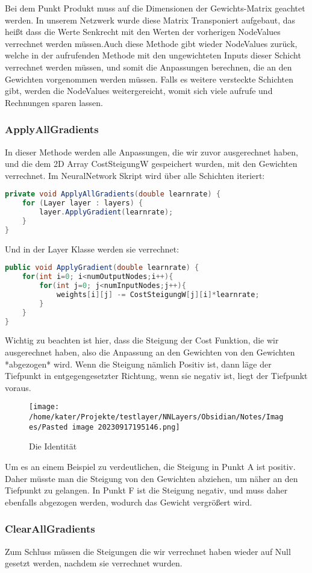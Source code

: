 \documentclass[12pt]{article}
\begin{document}
Bei dem Punkt Produkt muss auf die Dimensionen der Gewichts-Matrix geachtet werden. In unserem Netzwerk wurde diese Matrix Transponiert aufgebaut, das heißt dass die Werte Senkrecht mit den Werten der vorherigen NodeValues verrechnet werden müssen.Auch diese Methode gibt wieder NodeValues zurück, welche in der aufrufenden Methode mit den ungewichteten Inputs dieser Schicht verrechnet werden müssen, und somit die Anpassungen berechnen, die an den Gewichten vorgenommen werden müssen. Falls es weitere versteckte Schichten gibt, werden die NodeValues weitergereicht, womit sich viele aufrufe und Rechnungen sparen lassen.\subsubsection{ ApplyAllGradients}In dieser Methode werden alle Anpassungen, die wir zuvor ausgerechnet haben, und die dem 2D Array CostSteigungW gespeichert wurden, mit den Gewichten verrechnet. Im NeuralNetwork Skript wird über alle Schichten iteriert:\begin{lstlisting}[language=Java]
private void ApplyAllGradients(double learnrate) {
    for (Layer layer : layers) {
        layer.ApplyGradient(learnrate);
    }
}
\end{lstlisting}Und in der Layer Klasse werden sie verrechnet:\begin{lstlisting}[language=Java]
public void ApplyGradient(double learnrate) {
    for(int i=0; i<numOutputNodes;i++){
        for(int j=0; j<numInputNodes;j++){
            weights[i][j] -= CostSteigungW[j][i]*learnrate;
        }
    }
}
\end{lstlisting}Wichtig zu beachten ist hier, dass die Steigung der Cost Funktion, die wir ausgerechnet haben, also die Anpassung an den Gewichten von den Gewichten *abgezogen* wird. Wenn die Steigung nämlich Positiv ist, dann läge der Tiefpunkt in entgegengesetzter Richtung, wenn sie negativ ist, liegt der Tiefpunkt voraus.\begin{figure}[H]
\centering
\texttt{[image: /home/kater/Projekte/testlayer/NNLayers/Obsidian/Notes/Images/Pasted image 20230917195146.png]}
\caption{Die Identität}
\label{Was kommt hier rein?}\end{figure}Um es an einem Beispiel zu verdeutlichen, die Steigung in Punkt A ist positiv. Daher müsste man die Steigung von den Gewichten abziehen, um näher an den Tiefpunkt zu gelangen. In Punkt F ist die Steigung negativ, und muss daher ebenfalls abgezogen werden, wodurch das Gewicht vergrößert wird.\subsubsection{ ClearAllGradients}Zum Schluss müssen die Steigungen die wir verrechnet haben wieder auf Null gesetzt werden, nachdem sie verrechnet wurden.
\end{document}
